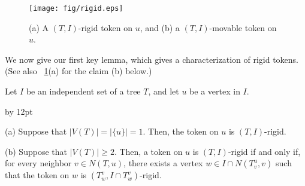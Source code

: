 \documentclass{llncs}
\newcommand{\msize}[1]{{\left|#1\right|}}
\newcommand{\Nei}[2]{N(#1,#2)}
\newcommand{\Tsub}[2]{T_{#1}^{#2}}
\newcommand{\bfI}{I}
\newenvironment{listing}[1]{\begin{list}{*}{\settowidth{\labelwidth}{#1}\setlength{\leftmargin}{\labelwidth}\advance \leftmargin by 12pt
\setlength{\itemsep}{0pt}\setlength{\parsep}{0pt}\setlength{\topsep}{0pt}\setlength{\parskip}{0pt}}}{\end{list}}
\begin{document}
 \begin{figure}[b]
\begin{center}
	\texttt{[image: fig/rigid.eps]}
	\end{center}
	\vspace{-1em}
	\caption{(a) A $(T, \bfI)$-rigid token on $u$, and (b) a $(T, \bfI)$-movable token on $u$.}
	\label{fig:rigidmovable}
\end{figure}

	We now give our first key lemma, which gives a characterization of rigid tokens. 
(See also \figurename~\ref{fig:rigidmovable}(a) for the claim (b) below.)
	\begin{lemma} \label{lem:rigid}
	Let $\bfI$ be an independent set of a tree $T$, and let $u$ be a vertex in $\bfI$.
	\begin{listing}{aaa}
	\item[{\rm (}a{\rm )}] Suppose that $\msize{V(T)} = \msize{\{u\}} = 1$. Then, the token on $u$ is $(T,\bfI)$-rigid.
	\item[{\rm (}b{\rm )}] Suppose that $\msize{V(T)} \ge 2$. 
					Then, a token on $u$ is $(T,\bfI)$-rigid if and only if, 
					for every neighbor $v \in \Nei{T}{u}$, there exists a vertex $w \in \bfI \cap \Nei{\Tsub{v}{u}}{v}$
					such that the token on $w$ is $(\Tsub{w}{v}, \bfI \cap \Tsub{w}{v})$-rigid.
	\end{listing}
	\end{lemma}
\end{document}
